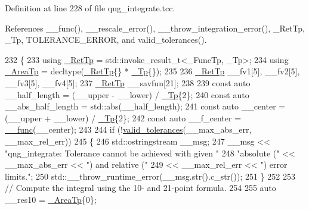 Definition at line 228 of file qng\+\_\+integrate.\+tcc.



References \+\_\+\+\_\+func(), \+\_\+\+\_\+rescale\+\_\+error(), \+\_\+\+\_\+throw\+\_\+integration\+\_\+error(), \+\_\+\+Ret\+Tp, \+\_\+\+Tp, T\+O\+L\+E\+R\+A\+N\+C\+E\+\_\+\+E\+R\+R\+OR, and valid\+\_\+tolerances().


\begin{DoxyCode}
232     \{
233       \textcolor{keyword}{using} \hyperlink{namespace____gnu__cxx_a886e03ece3d53ff7fa6c098a40f93fa5}{\_RetTp} = std::invoke\_result\_t<\_FuncTp, \_Tp>;
234       \textcolor{keyword}{using} \hyperlink{namespace____gnu__cxx_ae97a51b75e19c30f48d27fac4664de6e}{\_AreaTp} = decltype(\hyperlink{namespace____gnu__cxx_a886e03ece3d53ff7fa6c098a40f93fa5}{\_RetTp}\{\} * \hyperlink{namespace____gnu__cxx_a3b19a9c800ca194374ef9172290f7d79}{\_Tp}\{\});
235 
236       \hyperlink{namespace____gnu__cxx_a886e03ece3d53ff7fa6c098a40f93fa5}{\_RetTp} \_\_fv1[5], \_\_fv2[5], \_\_fv3[5], \_\_fv4[5];
237       \hyperlink{namespace____gnu__cxx_a886e03ece3d53ff7fa6c098a40f93fa5}{\_RetTp} \_\_savfun[21];
238 
239       \textcolor{keyword}{const} \textcolor{keyword}{auto} \_\_half\_length = (\_\_upper - \_\_lower) / \hyperlink{namespace____gnu__cxx_a3b19a9c800ca194374ef9172290f7d79}{\_Tp}\{2\};
240       \textcolor{keyword}{const} \textcolor{keyword}{auto} \_\_abs\_half\_length = std::abs(\_\_half\_length);
241       \textcolor{keyword}{const} \textcolor{keyword}{auto} \_\_center = (\_\_upper + \_\_lower) / \hyperlink{namespace____gnu__cxx_a3b19a9c800ca194374ef9172290f7d79}{\_Tp}\{2\};
242       \textcolor{keyword}{const} \textcolor{keyword}{auto} \_\_f\_center = \hyperlink{namespace____gnu__cxx_af2b2f0c7a2ae72b922b1afefae5a65b2}{\_\_func}(\_\_center);
243 
244       \textcolor{keywordflow}{if} (!\hyperlink{namespace____gnu__cxx_a86b1d89b2e2cb97614fdf3425d3dccd5}{valid\_tolerances}(\_\_max\_abs\_err, \_\_max\_rel\_err))
245         \{
246           std::ostringstream \_\_msg;
247           \_\_msg << \textcolor{stringliteral}{"qng\_integrate: Tolerance cannot be achieved with given "}
248                    \textcolor{stringliteral}{"absolute ("} << \_\_max\_abs\_err << \textcolor{stringliteral}{") and relative ("}
249                 << \_\_max\_rel\_err << \textcolor{stringliteral}{") error limits."};
250           std::\_\_throw\_runtime\_error(\_\_msg.str().c\_str());
251         \}
252 
253       \textcolor{comment}{// Compute the integral using the 10- and 21-point formula.}
254 
255       \textcolor{keyword}{auto} \_\_res10 = \hyperlink{namespace____gnu__cxx_ae97a51b75e19c30f48d27fac4664de6e}{\_AreaTp}\{0\};

\end{DoxyCode}
